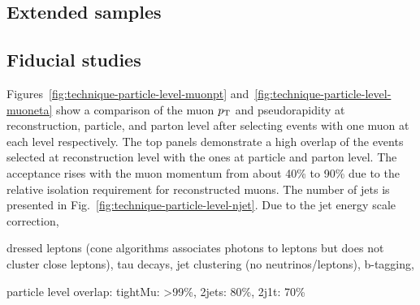 \subsection{Extended samples}

\subsection{Fiducial studies}
\label{sec:diff13-fiducial-studies}



Figures~\ref{fig:technique-particle-level-muonpt} and~\ref{fig:technique-particle-level-muoneta} show a comparison of the muon $p_\textrm{T}$ and pseudorapidity at reconstruction, particle, and parton level after selecting events with one muon at each level respectively. The top panels demonstrate a high overlap of the events selected at reconstruction level with the ones at particle and parton level. The acceptance rises with the muon momentum from about 40\% to 90\% due to the relative isolation requirement for reconstructed muons. The number of jets is presented in Fig.~\ref{fig:technique-particle-level-njet}. Due to the jet energy scale correction, 


dressed leptons (cone algorithms associates photons to leptons but does not cluster close leptons), tau decays, jet clustering (no neutrinos/leptons), b-tagging,




particle level overlap: tightMu: >99\%, 2jets: 80\%, 2j1t: 70\%


